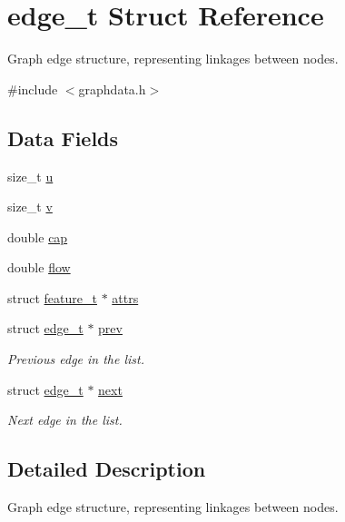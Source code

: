 \hypertarget{structedge__t}{}\section{edge\+\_\+t Struct Reference}
\label{structedge__t}


Graph edge structure, representing linkages between nodes.  




{\ttfamily \#include $<$graphdata.\+h$>$}

\subsection*{Data Fields}
\begin{DoxyCompactItemize}
\item 
size\+\_\+t \hyperlink{structedge__t_a2bd21781f62242a78e70595ea781769c}{u}
\item 
size\+\_\+t \hyperlink{structedge__t_a23bf912e6f3c953e2f8577ab7c692e85}{v}
\item 
double \hyperlink{structedge__t_a008f610ba47f30e49b6350e4bb00d6aa}{cap}
\item 
double \hyperlink{structedge__t_a45d88baf5d0fa8abd4b512e6856b9b2d}{flow}
\item 
struct \hyperlink{structfeature__t}{feature\+\_\+t} $\ast$ \hyperlink{structedge__t_afef8b0abae38e565a0c21a3f9c863870}{attrs}
\item 
struct \hyperlink{structedge__t}{edge\+\_\+t} $\ast$ \hyperlink{structedge__t_ad68c87997feb8fdf8f38703a275b3b29}{prev}
\begin{DoxyCompactList}\small\item\em Previous edge in the list. \end{DoxyCompactList}\item 
struct \hyperlink{structedge__t}{edge\+\_\+t} $\ast$ \hyperlink{structedge__t_a1e36360af59a1ec80463b82e00362480}{next}
\begin{DoxyCompactList}\small\item\em Next edge in the list. \end{DoxyCompactList}\end{DoxyCompactItemize}


\subsection{Detailed Description}
Graph edge structure, representing linkages between nodes. 

